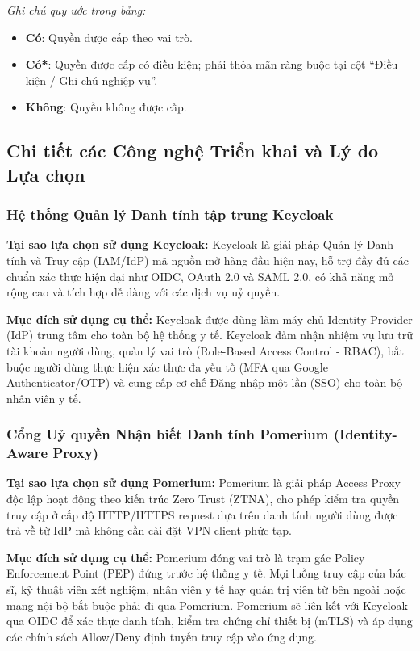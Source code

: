 \noindent\textit{Ghi chú quy ước trong bảng:}
\begin{itemize}
    \item \textbf{Có}: Quyền được cấp theo vai trò.
    \item \textbf{Có*}: Quyền được cấp có điều kiện; phải thỏa mãn ràng buộc tại cột ``Điều kiện / Ghi chú nghiệp vụ''.
    \item \textbf{Không}: Quyền không được cấp.
\end{itemize}

\subsection{Chi tiết các Công nghệ Triển khai và Lý do Lựa chọn}

\subsubsection{Hệ thống Quản lý Danh tính tập trung Keycloak}

\textbf{Tại sao lựa chọn sử dụng Keycloak:} Keycloak là giải pháp Quản lý Danh tính và Truy cập (IAM/IdP) mã nguồn mở hàng đầu hiện nay, hỗ trợ đầy đủ các chuẩn xác thực hiện đại như OIDC, OAuth 2.0 và SAML 2.0, có khả năng mở rộng cao và tích hợp dễ dàng với các dịch vụ uỷ quyền.

\textbf{Mục đích sử dụng cụ thể:} Keycloak được dùng làm máy chủ Identity Provider (IdP) trung tâm cho toàn bộ hệ thống y tế. Keycloak đảm nhận nhiệm vụ lưu trữ tài khoản người dùng, quản lý vai trò (Role-Based Access Control - RBAC), bắt buộc người dùng thực hiện xác thực đa yếu tố (MFA qua Google Authenticator/OTP) và cung cấp cơ chế Đăng nhập một lần (SSO) cho toàn bộ nhân viên y tế.

\subsubsection{Cổng Uỷ quyền Nhận biết Danh tính Pomerium (Identity-Aware Proxy)}

\textbf{Tại sao lựa chọn sử dụng Pomerium:} Pomerium là giải pháp Access Proxy độc lập hoạt động theo kiến trúc Zero Trust (ZTNA), cho phép kiểm tra quyền truy cập ở cấp độ HTTP/HTTPS request dựa trên danh tính người dùng được trả về từ IdP mà không cần cài đặt VPN client phức tạp.

\textbf{Mục đích sử dụng cụ thể:} Pomerium đóng vai trò là trạm gác Policy Enforcement Point (PEP) đứng trước hệ thống y tế. Mọi luồng truy cập của bác sĩ, kỹ thuật viên xét nghiệm, nhân viên y tế hay quản trị viên từ bên ngoài hoặc mạng nội bộ bắt buộc phải đi qua Pomerium. Pomerium sẽ liên kết với Keycloak qua OIDC để xác thực danh tính, kiểm tra chứng chỉ thiết bị (mTLS) và áp dụng các chính sách Allow/Deny định tuyến truy cập vào ứng dụng.

